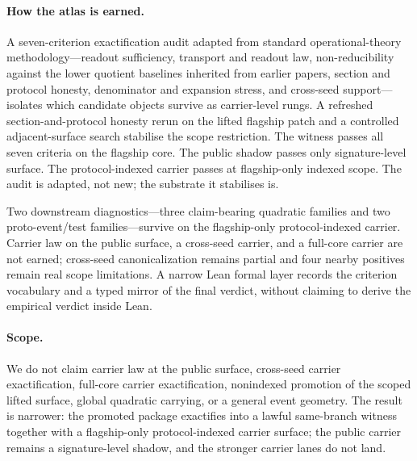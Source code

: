 \documentclass[11pt]{article}
\theoremstyle{definition}
\begin{document}
\paragraph{How the atlas is earned.} A seven-criterion exactification audit adapted from standard operational-theory methodology---readout sufficiency, transport and readout law, non-reducibility against the lower quotient baselines inherited from earlier papers, section and protocol honesty, denominator and expansion stress, and cross-seed support---isolates which candidate objects survive as carrier-level rungs. A refreshed section-and-protocol honesty rerun on the lifted flagship patch and a controlled adjacent-surface search stabilise the scope restriction. The witness passes all seven criteria on the flagship core. The public shadow passes only signature-level surface. The protocol-indexed carrier passes at flagship-only indexed scope. The audit is adapted, not new; the substrate it stabilises is.

Two downstream diagnostics---three claim-bearing quadratic families and two proto-event/test families---survive on the flagship-only protocol-indexed carrier. Carrier law on the public surface, a cross-seed carrier, and a full-core carrier are not earned; cross-seed canonicalization remains partial and four nearby positives remain real scope limitations. A narrow Lean formal layer records the criterion vocabulary and a typed mirror of the final verdict, without claiming to derive the empirical verdict inside Lean.

\paragraph{Scope.} We do not claim carrier law at the public surface, cross-seed carrier exactification, full-core carrier exactification, nonindexed promotion of the scoped lifted surface, global quadratic carrying, or a general event geometry. The result is narrower: the promoted package exactifies into a lawful same-branch witness together with a flagship-only protocol-indexed carrier surface; the public carrier remains a signature-level shadow, and the stronger carrier lanes do not land.
\end{document}
